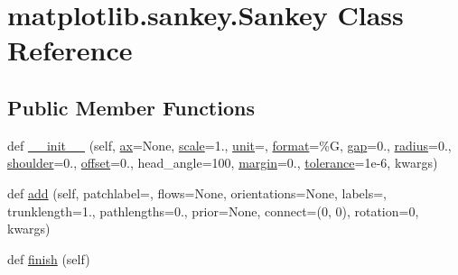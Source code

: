 \hypertarget{classmatplotlib_1_1sankey_1_1Sankey}{}\section{matplotlib.\+sankey.\+Sankey Class Reference}
\label{classmatplotlib_1_1sankey_1_1Sankey}
\subsection*{Public Member Functions}
\begin{DoxyCompactItemize}
\item 
def \hyperlink{classmatplotlib_1_1sankey_1_1Sankey_ab445906edf68a057b3f170b449614a94}{\+\_\+\+\_\+init\+\_\+\+\_\+} (self, \hyperlink{classmatplotlib_1_1sankey_1_1Sankey_af65ce4aa30db6f202bab576b9e00371d}{ax}=None, \hyperlink{classmatplotlib_1_1sankey_1_1Sankey_ad64f7253858e72fe031d0695219f343e}{scale}=1., \hyperlink{classmatplotlib_1_1sankey_1_1Sankey_aee04e3cc09339db7c145307e47f41f0c}{unit}=\textquotesingle{}\textquotesingle{}, \hyperlink{classmatplotlib_1_1sankey_1_1Sankey_ab979bfec5e6e2aba5cc5838895d359bb}{format}=\textquotesingle{}\%G\textquotesingle{}, \hyperlink{classmatplotlib_1_1sankey_1_1Sankey_aa1c1ab0bc8eb146c8a10e3ad8772d515}{gap}=0., \hyperlink{classmatplotlib_1_1sankey_1_1Sankey_a934e06a3529a1e439fa475f99a1f313e}{radius}=0., \hyperlink{classmatplotlib_1_1sankey_1_1Sankey_a9c51cb448b29baf758080fe073a38558}{shoulder}=0., \hyperlink{classmatplotlib_1_1sankey_1_1Sankey_ac292e7aafeff7a2fc449bcd1ea93d3b7}{offset}=0., head\+\_\+angle=100, \hyperlink{classmatplotlib_1_1sankey_1_1Sankey_a4ebac29b6132b67aa72c312971feec58}{margin}=0., \hyperlink{classmatplotlib_1_1sankey_1_1Sankey_ad1f395cfb14ba7b70e7f5c5daab9f333}{tolerance}=1e-\/6, kwargs)
\item 
def \hyperlink{classmatplotlib_1_1sankey_1_1Sankey_a231e1e53a5750196b35d7d5ee92f5e24}{add} (self, patchlabel=\textquotesingle{}\textquotesingle{}, flows=None, orientations=None, labels=\textquotesingle{}\textquotesingle{}, trunklength=1., pathlengths=0., prior=None, connect=(0, 0), rotation=0, kwargs)
\item 
def \hyperlink{classmatplotlib_1_1sankey_1_1Sankey_aa0c7831861b5926172ba8bedba783022}{finish} (self)
\end{DoxyCompactItemize}
